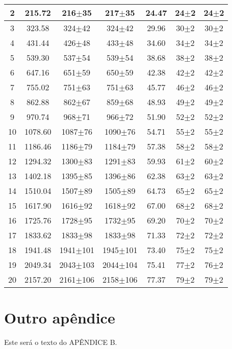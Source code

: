 \begin{table}
\begin{tabular}{|c|c|c|c|c|c|c|}
2&215.72&216$\pm$35&217$\pm$35&24.47&24$\pm$2&24$\pm$2\\ \hline 
3&323.58&324$\pm$42&324$\pm$42&29.96&30$\pm$2&30$\pm$2\\ \hline 
4&431.44&426$\pm$48&433$\pm$48&34.60&34$\pm$2&34$\pm$2\\ \hline 
5&539.30&537$\pm$54&539$\pm$54&38.68&38$\pm$2&38$\pm$2\\ \hline 
6&647.16&651$\pm$59&650$\pm$59&42.38&42$\pm$2&42$\pm$2\\ \hline 
7&755.02&751$\pm$63&751$\pm$63&45.77&46$\pm$2&46$\pm$2\\ \hline 
8&862.88&862$\pm$67&859$\pm$68&48.93&49$\pm$2&49$\pm$2\\ \hline 
9&970.74&968$\pm$71&966$\pm$72&51.90&52$\pm$2&52$\pm$2\\ \hline 
10&1078.60&1087$\pm$76&1090$\pm$76&54.71&55$\pm$2&55$\pm$2\\ \hline 
11&1186.46&1186$\pm$79&1184$\pm$79&57.38&58$\pm$2&58$\pm$2\\ \hline 
12&1294.32&1300$\pm$83&1291$\pm$83&59.93&61$\pm$2&60$\pm$2\\ \hline 
13&1402.18&1395$\pm$85&1396$\pm$86&62.38&63$\pm$2&63$\pm$2\\ \hline 
14&1510.04&1507$\pm$89&1505$\pm$89&64.73&65$\pm$2&65$\pm$2\\ \hline 
15&1617.90&1616$\pm$92&1618$\pm$92&67.00&68$\pm$2&68$\pm$2\\ \hline 
16&1725.76&1728$\pm$95&1732$\pm$95&69.20&70$\pm$2&70$\pm$2\\ \hline 
17&1833.62&1833$\pm$98&1833$\pm$98&71.33&72$\pm$2&72$\pm$2\\ \hline 
18&1941.48&1941$\pm$101&1945$\pm$101&73.40&75$\pm$2&75$\pm$2\\ \hline 
19&2049.34&2043$\pm$103&2044$\pm$104&75.41&77$\pm$2&76$\pm$2\\ \hline 
20&2157.20&2161$\pm$106&2158$\pm$106&77.37&79$\pm$2&79$\pm$2\\ \hline 
\end{tabular} 
\end{table} 


\chapter{Outro apêndice}

Este será o texto do APÊNDICE B.

